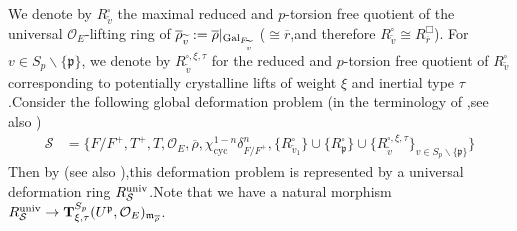 \documentclass[SecEq,CM,GP]{degruyter-crelle} %
\theoremstyle{plain}
\newcommand{\defvarring}{{R_{\overline{r}}^\Box}}
\newcommand{\gal}{{\rm Gal}}
\newcommand{\univ}{{\rm univ}}
\newcommand{\bT}{{\mathbf{T}}}
\newcommand{\co}{\mathcal O}
\newcommand{\cS}{\mathcal S}
\newcommand{\cO}{\mathcal O}
\newcommand{\fm}{{\mathfrak{m}}}
\newcommand{\fp}{{\mathfrak{p}}}
\begin{document}
We denote by $R_{\widetilde{v}}^{\square}$ the maximal reduced and $p$-torsion free quotient of the universal $\co_E$-lifting ring of $\overline{\rho}_{\widetilde{v}}:=\overline{\rho}|_{\gal_{F_{\widetilde{v}}}}$ ($\cong \overline{r}$,\;and therefore $R_{\widetilde{v}}^{\square}\cong \defvarring$). For $v\in S_p\backslash\{\fp\}$, we denote by $R_{\widetilde{v}}^{\square, \xi,\tau}$ for the reduced and $p$-torsion free quotient of $R_{\widetilde{v}}^{\square}$ corresponding to potentially crystalline lifts of weight $\xi$ and inertial type $\tau$.\;Consider the following global deformation problem (in the terminology of \cite{clozel2008automorphy},\;see also \cite[Section 2.4]{PATCHING2016})
\begin{equation*}
\begin{aligned}
	\cS&=\bigg\{{F}/{F}^+,T^+,T,\cO_E,\overline{\rho},\chi_{\mathrm{cyc}}^{1-n}\delta_{{F}/{F}^+}^n,\{R_{\widetilde{v}_1}^{\square}\}\cup
	\{R_{\fp}^{\square}\}\cup \{R_{\widetilde{v}}^{\square, \xi,\tau}\}_{v\in S_p\backslash \{\fp\}}\bigg\}
\end{aligned}
\end{equation*}
Then by  \cite[Proposition 2.2.9]{clozel2008automorphy} (see also \cite[Section 2.4]{PATCHING2016}),\;this deformation problem is represented by a universal deformation ring $R_{\cS}^{\univ}$.\;Note that we have a natural morphism $R_{\cS}^{\univ}\rightarrow \bT_{\xi,\tau}^{S_p}(U^{\fp}, \co_E)_{\fm_{\overline{\rho}}}$.\;
\end{document}
